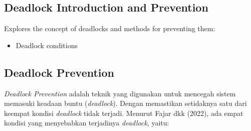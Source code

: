 \documentclass[12pt]{article}
\begin{document}
\subsection{Deadlock Introduction and Prevention}
Explores the concept of deadlocks and methods for preventing them:
\begin{itemize}
    \item Deadlock conditions
    \end{itemize}
    \subsection{Deadlock Prevention} 
\hspace{1cm} \textit{Deadlock Prevention} adalah teknik yang digunakan untuk mencegah sistem memasuki keadaan buntu (\textit{deadlock}). Dengan memastikan setidaknya satu dari keempat kondisi \textit{deadlock} tidak terjadi. Menurut Fajar dkk (2022), ada empat kondisi yang menyebabkan terjadinya \textit{deadlock}, yaitu:
\end{document}
